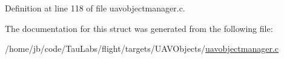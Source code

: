 \-Definition at line 118 of file uavobjectmanager.\-c.



\-The documentation for this struct was generated from the following file\-:\begin{DoxyCompactItemize}
\item 
/home/jb/code/\-Tau\-Labs/flight/targets/\-U\-A\-V\-Objects/\hyperlink{uavobjectmanager_8c}{uavobjectmanager.\-c}\end{DoxyCompactItemize}
